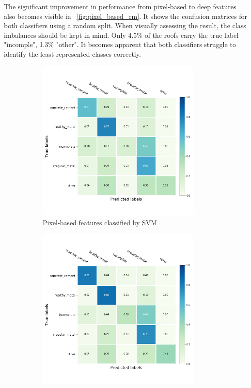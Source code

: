 \documentclass[11pt]{article}
\begin{document}
	The significant improvement in performance from pixel-based to deep features also becomes visible in ~\ref{fig:pixel_based_cm}. It shows the confusion matrices for both classifiers using a random split. When visually assessing the result, the class imbalances should be kept in mind. Only 4.5\% of the roofs carry the true label "incomple", 1.3\% "other". It becomes apparent that both classifiers struggle to identify the least represented classes correctly.
	
	\begin{figure}
		\begin{subfigure}[t]{.5\textwidth}
			\centering
			\includegraphics[width=0.9\textwidth]{figures/results/pixel_based_cm.png}
			\caption{Pixel-based features classified by SVM}
		\end{subfigure}
		\begin{subfigure}[t]{.5\textwidth}
			\centering
			\includegraphics[width=0.9\textwidth]{figures/results/nn_based_cm_svm.png}

\end{subfigure}
\end{figure}
\end{document}
